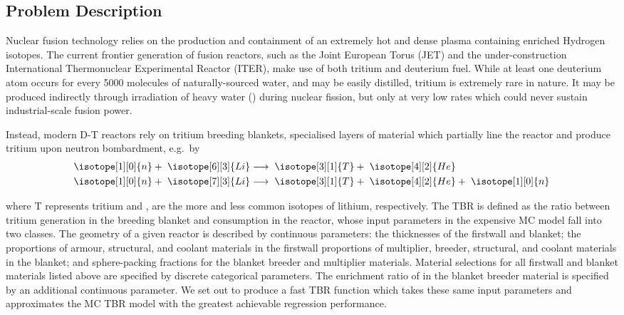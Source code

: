 \subsection{Problem Description}
\label{sec:problemdescription}

Nuclear fusion technology relies on the production and containment of an
extremely hot and dense plasma containing enriched Hydrogen isotopes. The current frontier generation of fusion reactors, such as the Joint European Torus (JET) and the
under-construction International Thermonuclear Experimental Reactor (ITER), make
use of both tritium and deuterium fuel. While at least one deuterium atom occurs for every \num{5000} molecules of naturally-sourced water, and may be easily distilled, tritium is extremely rare in nature. It may be produced indirectly through irradiation of heavy water
(\DDO) during nuclear fission, but only at very low rates which could
never sustain industrial-scale fusion power.

Instead, modern D-T reactors rely on tritium breeding blankets, specialised
layers of material which partially line the reactor and produce tritium upon
neutron bombardment, e.g.~by 
\begin{eqnarray}
	\isotope[1][0]{n} + \hspace{3pt} \isotope[6][3]{Li} 
	&\longrightarrow \hspace{3pt} 
	\isotope[3][1]{T} + \hspace{3pt}\isotope[4][2]{He} \\
	\isotope[1][0]{n} + \hspace{3pt} \isotope[7][3]{Li} 
	&\longrightarrow \hspace{3pt} 
	\isotope[3][1]{T} + \hspace{3pt} \isotope[4][2]{He} + \hspace{3pt} \isotope[1][0]{n}
\end{eqnarray}

where T represents tritium and ,  are the more and
less common isotopes of lithium, respectively. The TBR is defined as the ratio between tritium generation in the breeding blanket and consumption in the reactor, whose input parameters in the expensive MC model fall
into two classes. The geometry of a given reactor is described by continuous parameters: the thicknesses of the firstwall and blanket; the proportions of armour, structural, and coolant materials in the firstwall proportions of multiplier, breeder, structural, and coolant materials in the blanket; and sphere-packing fractions for the blanket breeder and multiplier materials. Material selections for all firstwall and blanket materials listed above are specified by discrete
categorical parameters. The enrichment ratio of  in the blanket breeder material is specified by an additional continuous parameter. We set out to produce a fast TBR
function which takes these same input parameters and approximates the MC TBR
model with the greatest achievable regression performance.

